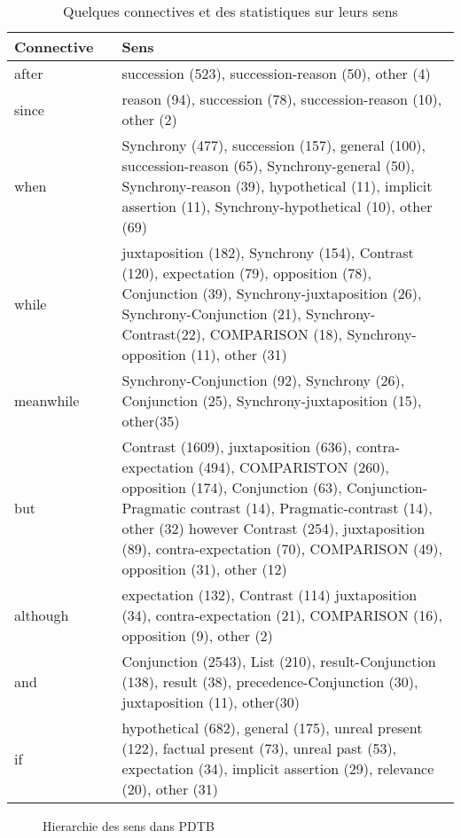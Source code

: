 \documentclass{KodeBook}
\begin{document}
\begin{table}[ht]
	\centering\small
	\begin{tabular}{p{}lp{}}
		\hline\hline
		\textbf{Connective} && \textbf{Sens}\\
		\hline
		
		after && succession (523), succession-reason (50), other (4) \\
		since && reason (94), succession (78), succession-reason (10), other (2) \\
		when && Synchrony (477), succession (157), general (100), succession-reason (65), Synchrony-general (50),
		Synchrony-reason (39), hypothetical (11), implicit assertion (11), Synchrony-hypothetical (10), other
		(69) \\
		while && juxtaposition (182), Synchrony (154), Contrast (120), expectation (79), opposition (78), Conjunction
		(39), Synchrony-juxtaposition (26), Synchrony-Conjunction (21), Synchrony-Contrast(22), COMPARISON (18), Synchrony-opposition (11), other (31) \\
		meanwhile && Synchrony-Conjunction (92), Synchrony (26), Conjunction (25), Synchrony-juxtaposition (15),
		other(35)\\
		but && Contrast (1609), juxtaposition (636), contra-expectation (494), COMPARISTON (260), opposition
		(174), Conjunction (63), Conjunction-Pragmatic contrast (14), Pragmatic-contrast (14), other (32)
		however Contrast (254), juxtaposition (89), contra-expectation (70), COMPARISON (49), opposition (31),
		other (12)\\
		although && expectation (132), Contrast (114) juxtaposition (34), contra-expectation (21), COMPARISON (16),
		opposition (9), other (2)\\
		and && Conjunction (2543), List (210), result-Conjunction (138), result (38), precedence-Conjunction (30),
		juxtaposition (11), other(30)\\
		if && hypothetical (682), general (175), unreal present (122), factual present (73), unreal past (53), expectation (34), implicit assertion (29), relevance (20), other (31)\\
		\hline\hline
	\end{tabular}
	\caption{Quelques connectives et des statistiques sur leurs sens \cite{2008-prasad-al}}
\end{table}

\begin{figure}
	\centering
	\caption{Hierarchie des sens dans PDTB \cite{2008-prasad-al}}
\end{figure}
\end{document}
